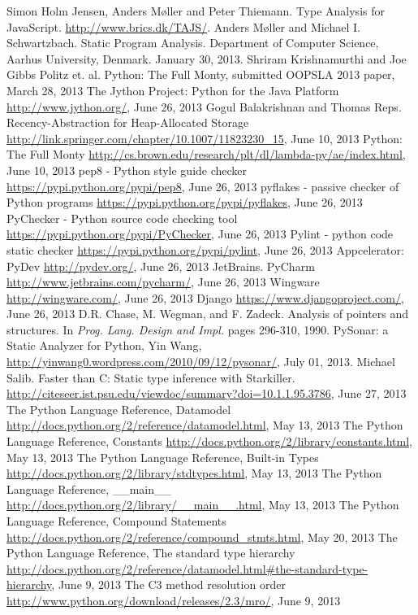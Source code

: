 \begin{thebibliography}{8}

 Simon Holm Jensen, Anders M\o ller and Peter Thiemann. Type Analysis for JavaScript. \url{http://www.brics.dk/TAJS/}.
 Anders M\o ller and Michael I. Schwartzbach. Static Program Analysis. Department of Computer Science, Aarhus University, Denmark. January 30, 2013.
 Shriram Krishnamurthi and Joe Gibbs Politz et. al. Python: The Full Monty, submitted OOPSLA 2013 paper, March 28, 2013
 The Jython Project: Python for the Java Platform \url{http://www.jython.org/}, June 26, 2013
 Gogul Balakrishnan and Thomas Reps. Recency-Abstraction for Heap-Allocated Storage \url{http://link.springer.com/chapter/10.1007/11823230_15}, June 10, 2013
 Python: The Full Monty \url{http://cs.brown.edu/research/plt/dl/lambda-py/ae/index.html}, June 10, 2013
 pep8 - Python style guide checker \url{https://pypi.python.org/pypi/pep8}, June 26, 2013
 pyflakes - passive checker of Python programs \url{https://pypi.python.org/pypi/pyflakes}, June 26, 2013
 PyChecker - Python source code checking tool \url{https://pypi.python.org/pypi/PyChecker}, June 26, 2013
 Pylint - python code static checker \url{https://pypi.python.org/pypi/pylint}, June 26, 2013
 Appcelerator: PyDev \url{http://pydev.org/}, June 26, 2013
 JetBrains. PyCharm \url{http://www.jetbrains.com/pycharm/}, June 26, 2013
 Wingware \url{http://wingware.com/}, June 26, 2013
 Django \url{https://www.djangoproject.com/}, June 26, 2013
 D.R. Chase, M. Wegman, and F. Zadeck. Analysis of pointers and structures. In \textit{Prog. Lang. Design and Impl.} pages 296-310, 1990.
 PySonar: a Static Analyzer for Python, Yin Wang, \url{http://yinwang0.wordpress.com/2010/09/12/pysonar/}, July 01, 2013.
 Michael Salib. Faster than C: Static type inference with Starkiller. \url{http://citeseer.ist.psu.edu/viewdoc/summary?doi=10.1.1.95.3786}, June 27, 2013
 The Python Language Reference, Datamodel \url{http://docs.python.org/2/reference/datamodel.html}, May 13, 2013
 The Python Language Reference, Constants \url{http://docs.python.org/2/library/constants.html}, May 13, 2013
 The Python Language Reference, Built-in Types \url{http://docs.python.org/2/library/stdtypes.html}, May 13, 2013
 The Python Language Reference, \_\_main\_\_ \url{http://docs.python.org/2/library/__main__.html}, May 13, 2013
 The Python Language Reference, Compound Statements \url{http://docs.python.org/2/reference/compound_stmts.html}, May 20, 2013
 The Python Language Reference, The standard type hierarchy \url{http://docs.python.org/2/reference/datamodel.html#the-standard-type-hierarchy}, June 9, 2013
 The C3 method resolution order \url{http://www.python.org/download/releases/2.3/mro/}, June 9, 2013

\end{thebibliography}